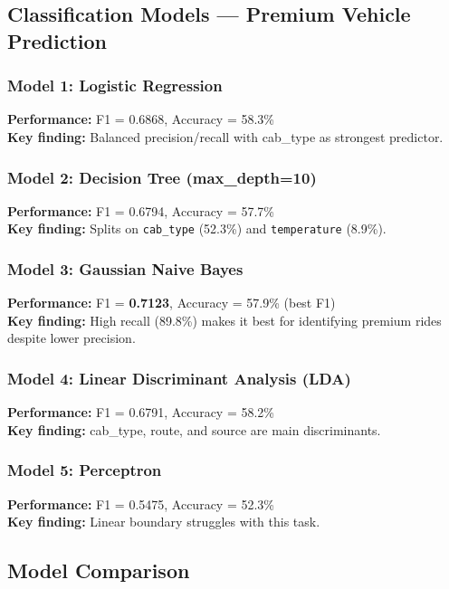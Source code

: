 \documentclass[12pt,a4paper]{article}
\begin{document}
\subsection{Classification Models --- Premium Vehicle Prediction}

\subsubsection*{Model 1: Logistic Regression}
\textbf{Performance:} F1 = 0.6868, Accuracy = 58.3\%\\
\textbf{Key finding:} Balanced precision/recall with cab\_type as strongest predictor.

\subsubsection*{Model 2: Decision Tree (max\_depth=10)}
\textbf{Performance:} F1 = 0.6794, Accuracy = 57.7\%\\
\textbf{Key finding:} Splits on \texttt{cab\_type} (52.3\%) and \texttt{temperature} (8.9\%).

\subsubsection*{Model 3: Gaussian Naive Bayes}
\textbf{Performance:} F1 = \textbf{0.7123}, Accuracy = 57.9\% (best F1)\\
\textbf{Key finding:} High recall (89.8\%) makes it best for identifying premium rides despite lower precision.

\subsubsection*{Model 4: Linear Discriminant Analysis (LDA)}
\textbf{Performance:} F1 = 0.6791, Accuracy = 58.2\%\\
\textbf{Key finding:} cab\_type, route, and source are main discriminants.

\subsubsection*{Model 5: Perceptron}
\textbf{Performance:} F1 = 0.5475, Accuracy = 52.3\%\\
\textbf{Key finding:} Linear boundary struggles with this task.

\subsection{Model Comparison}
\end{document}
